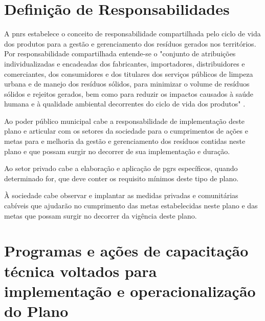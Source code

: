 \newpage
\section{Definição de Responsabilidades} %
\label{sec:def_resp}
	
A \gls{pnrs} estabelece o conceito de responsabilidade compartilhada pelo ciclo de vida dos produtos para a gestão e gerenciamento dos resíduos gerados nos territórios. Por responsabilidade compartilhada entende-se o "conjunto de atribuições individualizadas e encadeadas dos fabricantes, importadores, distribuidores e comerciantes, dos consumidores e dos titulares dos serviços públicos de limpeza urbana e de manejo dos resíduos sólidos, para minimizar o volume de resíduos sólidos e rejeitos gerados, bem como para reduzir os impactos causados à saúde humana e à qualidade ambiental decorrentes do ciclo de vida dos produtos" \cite{brasil:12305}.

Ao poder público municipal cabe a responsabilidade de implementação deste plano e articular com os setores da sociedade para o cumprimentos de ações e metas para e melhoria da gestão e gerenciamento dos resíduos contidas neste plano e que possam surgir no decorrer de sua implementação e duração.

Ao setor privado cabe a elaboração e aplicação de \gls{pgrs} específicos, quando determinado for, que deve conter os requisito mínimos deste tipo de plano. 

À sociedade cabe observar e implantar as medidas privadas e comunitárias cabíveis que ajudarão no cumprimento das metas estabelecidas neste plano e das metas que possam surgir no decorrer da vigência deste plano. 


	
\FloatBarrier
\newpage
\section{Programas e ações de capacitação técnica voltados para implementação e operacionalização do Plano}
\label{sec:capac_tec}

